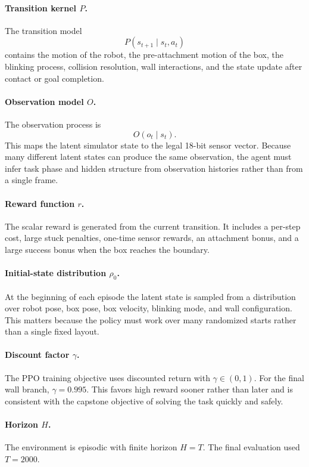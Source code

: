 \documentclass[11pt]{article}
\begin{document}
\paragraph{Transition kernel \(P\).}
The transition model
\[
  P(s_{t+1}\mid s_t,a_t)
\]
contains the motion of the robot, the pre-attachment motion of the box, the blinking
process, collision resolution, wall interactions, and the state update after contact or
goal completion.

\paragraph{Observation model \(O\).}
The observation process is
\[
  O(o_t\mid s_t).
\]
This maps the latent simulator state to the legal 18-bit sensor vector. Because many
different latent states can produce the same observation, the agent must infer task phase
and hidden structure from observation histories rather than from a single frame.

\paragraph{Reward function \(r\).}
The scalar reward is generated from the current transition. It includes a per-step cost,
large stuck penalties, one-time sensor rewards, an attachment bonus, and a large success
bonus when the box reaches the boundary.

\paragraph{Initial-state distribution \(\rho_0\).}
At the beginning of each episode the latent state is sampled from a distribution over
robot pose, box pose, box velocity, blinking mode, and wall configuration. This matters
because the policy must work over many randomized starts rather than a single fixed
layout.

\paragraph{Discount factor \(\gamma\).}
The PPO training objective uses discounted return with \(\gamma\in(0,1)\). For the final
wall branch, \(\gamma=0.995\). This favors high reward sooner rather than later and is
consistent with the capstone objective of solving the task quickly and safely.

\paragraph{Horizon \(H\).}
The environment is episodic with finite horizon \(H=T\). The final evaluation used
\(T=2000\).
\end{document}
